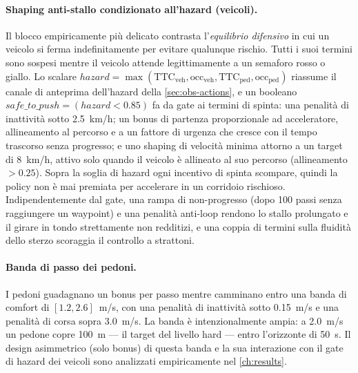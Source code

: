 \paragraph{Shaping anti-stallo condizionato all'hazard (veicoli).}
Il blocco empiricamente più delicato contrasta l'\emph{equilibrio
difensivo} in cui un veicolo si ferma indefinitamente per evitare
qualunque rischio. Tutti i suoi termini sono sospesi mentre il veicolo
attende legittimamente a un semaforo rosso o giallo. Lo scalare
$\mathit{hazard} =
\max(\text{TTC}_{\mathrm{veh}}, \text{occ}_{\mathrm{veh}},
\text{TTC}_{\mathrm{ped}}, \text{occ}_{\mathrm{ped}})$ riassume il
canale di anteprima dell'hazard della \cref{sec:obs-actions}, e un
booleano $\mathit{safe\_to\_push} = (\mathit{hazard} < 0.85)$ fa da gate
ai termini di spinta: una penalità di inattività sotto 2.5~km/h; un
bonus di partenza proporzionale ad acceleratore, allineamento al
percorso e a un fattore di urgenza che cresce con il tempo trascorso
senza progresso; e uno shaping di velocità minima attorno a un target di
8~km/h, attivo solo quando il veicolo è allineato al suo percorso
(allineamento $> 0.25$). Sopra la soglia di hazard ogni incentivo di
spinta scompare, quindi la policy non è mai premiata per accelerare in
un corridoio rischioso. Indipendentemente dal gate, una rampa di
non-progresso (dopo 100 passi senza raggiungere un waypoint) e una
penalità anti-loop rendono lo stallo prolungato e il girare in tondo
strettamente non redditizi, e una coppia di termini sulla fluidità dello
sterzo scoraggia il controllo a strattoni.

\paragraph{Banda di passo dei pedoni.}
I pedoni guadagnano un bonus per passo mentre camminano entro una banda
di comfort di $[1.2, 2.6]$~m/s, con una penalità di inattività sotto
0.15~m/s e una penalità di corsa sopra 3.0~m/s. La banda è
intenzionalmente ampia: a 2.0~m/s un pedone copre \SI{100}{m} --- il
target del livello hard --- entro l'orizzonte di \SI{50}{s}. Il design
asimmetrico (solo bonus) di questa banda e la sua interazione con il
gate di hazard dei veicoli sono analizzati empiricamente nel
\cref{ch:results}.

